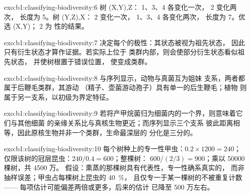 \begin{solution}{exo:b1:classifying-biodiversity:6}
树 (X,Y),Z： 1、3、4 各变化一次， 2 变化两次，
长度为 5。树 (Y,Z),X： 2 变化一次， 1、3、4 各变化两次，
长度为 7。优选 (X,Y)； 2 为
性的结果。
\end{solution}

\begin{solution}{exo:b1:classifying-biodiversity:7}
决定每个的极性：其状态被视为祖先状态，
因此只有衍生状态才算作证据。若实际上位于
类群内部，则会使部分衍生状态看似祖先状态，
并使树根置于错误位置，
使变成类群。
\end{solution}

\begin{solution}{exo:b1:classifying-biodiversity:8}
与序列显示，动物与真菌互为姐妹
支系，两者都属于后鞭毛类群，其游动
（精子、壶菌游动孢子）具有单一的后生鞭毛；植物
则属于另一支系，以初级为界定特征。
\end{solution}

\begin{solution}{exo:b1:classifying-biodiversity:9}
若将产甲烷菌归为细菌内的一个界，则意味着它们与其他细菌
的亲缘关系比与真核生物更近；而序列显示三个支系
彼此距离相等，因此原核生物并非一个类群，生命最深层的
分化是三分的。
\end{solution}

\begin{solution}{exo:b1:classifying-biodiversity:10}
每个树种上的专一性甲虫：$0.2\times 1200 = 240$；
仅限该树的冠层昆虫：$240/0.4 = 600$；整棵树：
$600/(2/3) = 900$；乘以 \num{50000} 棵树，共 4500 万。
假设：熏蒸的那棵树具有代表性，专一性确系真实的，
而非抽样误差；甲虫占每棵树上昆虫的 \qty{40}{\%}，
且仅专一于某一棵树的不被重复计数——
每项估计可能偏差两倍或更多，后来的估计
已降至 500 万左右。
\end{solution}


